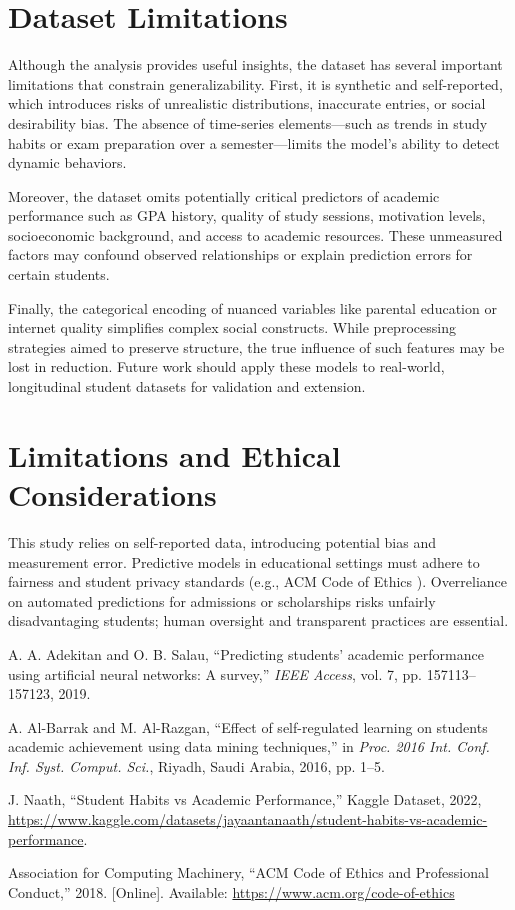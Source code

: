 \documentclass[conference]{IEEEtran}
\begin{document}
\section{Dataset Limitations}
Although the analysis provides useful insights, the dataset has several important limitations that constrain generalizability. First, it is synthetic and self-reported, which introduces risks of unrealistic distributions, inaccurate entries, or social desirability bias. The absence of time-series elements—such as trends in study habits or exam preparation over a semester—limits the model’s ability to detect dynamic behaviors.

Moreover, the dataset omits potentially critical predictors of academic performance such as GPA history, quality of study sessions, motivation levels, socioeconomic background, and access to academic resources. These unmeasured factors may confound observed relationships or explain prediction errors for certain students.

Finally, the categorical encoding of nuanced variables like parental education or internet quality simplifies complex social constructs. While preprocessing strategies aimed to preserve structure, the true influence of such features may be lost in reduction. Future work should apply these models to real-world, longitudinal student datasets for validation and extension.


\section{Limitations and Ethical Considerations}
This study relies on self-reported data, introducing potential bias and measurement error. Predictive models in educational settings must adhere to fairness and student privacy standards (e.g., ACM Code of Ethics \cite{acm2018}). Overreliance on automated predictions for admissions or scholarships risks unfairly disadvantaging students; human oversight and transparent practices are essential.

\begin{thebibliography}{1}
A. A. Adekitan and O. B. Salau, “Predicting students’ academic performance using artificial neural networks: A survey,” \emph{IEEE Access}, vol. 7, pp. 157113–157123, 2019.

A. Al-Barrak and M. Al-Razgan, “Effect of self-regulated learning on students academic achievement using data mining techniques,” in \emph{Proc. 2016 Int. Conf. Inf. Syst. Comput. Sci.}, Riyadh, Saudi Arabia, 2016, pp. 1–5.

J. Naath, “Student Habits vs Academic Performance,” Kaggle Dataset, 2022, \url{https://www.kaggle.com/datasets/jayaantanaath/student-habits-vs-academic-performance}.

Association for Computing Machinery, “ACM Code of Ethics and Professional Conduct,” 2018. [Online]. Available: \url{https://www.acm.org/code-of-ethics}
\end{thebibliography}
\end{document}

